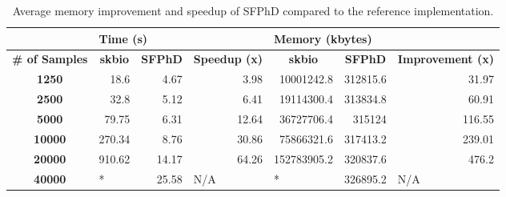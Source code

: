 \begin{table}
\caption[Average memory improvement and speedup of SFPhD compared to the reference implementation.]{Average memory improvement and speedup of SFPhD compared to the reference implementation.}
\label{faiths_pd_table1}
\centering
\begin{tabular}{|c|rrr|rrr|}
\hline
\multicolumn{1}{|l|}{} & \multicolumn{3}{l|}{Time (s)}                                                                                         & \multicolumn{3}{l|}{Memory (kbytes)}                                                                                      \\ \hline
\textbf{\# of Samples} & \multicolumn{1}{c|}{\textbf{skbio}} & \multicolumn{1}{c|}{\textbf{SFPhD}} & \multicolumn{1}{c|}{\textbf{Speedup (x)}} & \multicolumn{1}{c|}{\textbf{skbio}} & \multicolumn{1}{c|}{\textbf{SFPhD}} & \multicolumn{1}{c|}{\textbf{Improvement (x)}} \\ \hline
\textbf{1250}          & \multicolumn{1}{r|}{18.6}           & \multicolumn{1}{r|}{4.67}           & 3.98                                      & \multicolumn{1}{r|}{10001242.8}     & \multicolumn{1}{r|}{312815.6}       & 31.97                                         \\ \hline
\textbf{2500}          & \multicolumn{1}{r|}{32.8}           & \multicolumn{1}{r|}{5.12}           & 6.41                                      & \multicolumn{1}{r|}{19114300.4}     & \multicolumn{1}{r|}{313834.8}       & 60.91                                         \\ \hline
\textbf{5000}          & \multicolumn{1}{r|}{79.75}          & \multicolumn{1}{r|}{6.31}           & 12.64                                     & \multicolumn{1}{r|}{36727706.4}     & \multicolumn{1}{r|}{315124}         & 116.55                                        \\ \hline
\textbf{10000}         & \multicolumn{1}{r|}{270.34}         & \multicolumn{1}{r|}{8.76}           & 30.86                                     & \multicolumn{1}{r|}{75866321.6}     & \multicolumn{1}{r|}{317413.2}       & 239.01                                        \\ \hline
\textbf{20000}         & \multicolumn{1}{r|}{910.62}         & \multicolumn{1}{r|}{14.17}          & 64.26                                     & \multicolumn{1}{r|}{152783905.2}    & \multicolumn{1}{r|}{320837.6}       & 476.2                                         \\ \hline
\textbf{40000}         & \multicolumn{1}{l|}{*}              & \multicolumn{1}{r|}{25.58}          & \multicolumn{1}{l|}{N/A}                  & \multicolumn{1}{l|}{*}              & \multicolumn{1}{r|}{326895.2}       & \multicolumn{1}{l|}{N/A}                      \\ \hline

\end{tabular}
\end{table}
